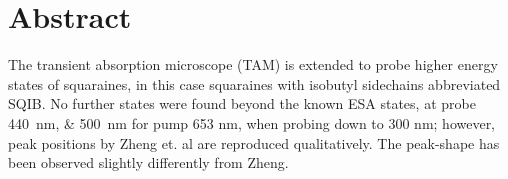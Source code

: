 \documentclass[twoside,openright,listof=numbered]{scrreprt}
\begin{document}
\nobibliography*







\printthesistitle


\chapter*{Abstract}
The transient absorption microscope (TAM) is extended to probe higher energy states of squaraines, in this case squaraines with isobutyl sidechains abbreviated SQIB. No further states were found beyond the known ESA states, at probe \SIlist{440;500}{\nano\meter} for  pump 653 nm, when probing down to 300 nm; however, peak positions by Zheng et. al\cite{Zheng2020} are reproduced qualitatively. The peak-shape has been observed slightly differently from Zheng. 
\end{document}
